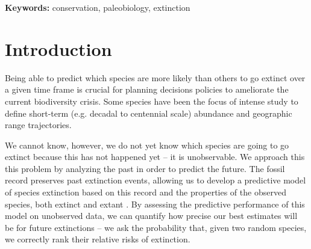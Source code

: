 \documentclass[12pt,letterpaper]{article}
\begin{document}
\begin{refsection}
\begin{abstract}
\end{abstract}

{\bf Keywords:} conservation, paleobiology, extinction



\section{Introduction}

Being able to predict which species are more likely than others to go extinct over a given time frame is crucial for planning decisions policies to ameliorate the current biodiversity crisis. Some species have been the focus of intense study to define short-term (e.g. decadal to centennial scale) abundance and geographic range trajectories. 

We cannot know, however, we do not yet know which species are going to go extinct because this has not happened yet -- it is unobservable. We approach this this problem by analyzing the past in order to predict the future. The fossil record preserves past extinction events, allowing us to develop a predictive model of species extinction based on this record and the properties of the observed species, both extinct and extant \citep{Harnik2012a,Finnegan2015}. By assessing the predictive performance of this model on unobserved data, we can quantify how precise our best estimates will be for future extinctions -- we ask the probability that, given two random species, we correctly rank their relative risks of extinction.


\end{refsection}
\end{document}
